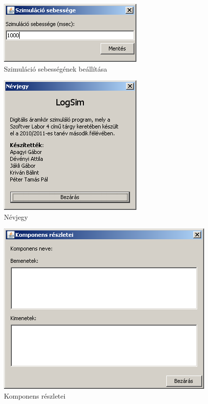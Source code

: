 \begin{figure}[H]
\begin{center}
\includegraphics[width=2.8125in]{chapters/chapter11/screenshots/szimseb.png}
\caption{Szimuláció sebességének beállítása}
\label{fig:szimseb}
\end{center}
\end{figure}

\begin{figure}[H]
\begin{center}
\includegraphics[width=2.8125in]{chapters/chapter11/screenshots/about.png}
\caption{Névjegy}
\label{fig:about}
\end{center}
\end{figure}

\begin{figure}[H]
\begin{center}
\includegraphics[width=4.25in]{chapters/chapter11/screenshots/details.png}
\caption{Komponens részletei}
\label{fig:gui_szimseb}
\end{center}
\end{figure}

